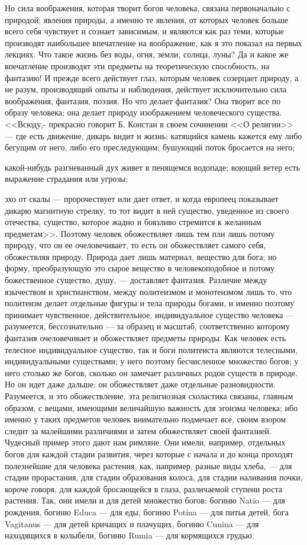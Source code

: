 \documentclass[12pt]{article}
\begin{document}
Но сила воображения, которая творит богов человека, связана первоначально с природой; явления природы, а именно те явления, от которых человек больше всего себя чувствует и сознает зависимым, и являются как раз теми, которые производят наибольшее впечатление на воображение, как я это показал на первых лекциях. Что такое жизнь без воды, огня, земли, солнца, луны? Да и какое же впечатление производят эти предметы на теоретическую способность, на фантазию! И прежде всего действует глаз, которым человек созерцает природу, а не разум, производящий опыты и наблюдения, действует исключительно сила воображения, фантазия, поэзия. Но что делает фантазия? Она творит все по образу человека; она делает природу изображением человеческого существа. <<Всюду,- прекрасно говорит Б. Констан в своем сочинении <<О религии>>  --- где есть движение, дикарь видит и жизнь; катящийся камень кажется ему либо бегущим от него, либо его преследующим; бушующий поток бросается на него; 

какой-нибудь разгневанный дух живет в пенящемся водопаде; воющий ветер есть выражение страдания или угрозы; 

эхо от скалы --- пророчествует или дает ответ, и когда европеец показывает дикарю магнитную стрелку, то тот видит в ней существо, уведенное из своего отечества, существо, которое жадно и боязливо стремится к желанным предметам>>. Поэтому человек обожествляет лишь тем пли лишь потому природу, что он ее очеловечивает, то есть он обожествляет самого себя, обожествляя природу. Природа дает лишь материал, вещество для бога; но форму, преобразующую это сырое вещество в человекоподобное и потому божественное существо, душу, --- доставляет фантазия. Различие между язычеством и христианством, между политеизмом и монотеизмом лишь то, что политеизм делает отдельные фигуры и тела природы богами, и именно поэтому принимает чувственное, действительное, индивидуальное существо человека --- разумеется, бессознательно --- за образец и масштаб, соответственно которому фантазия очеловечивает и обожествляет предметы природы. Как человек есть телесное индивидуальное существо, так и боги политеиста являются телесными, индивидуальными существами; у него поэтому бесчисленное множество богов; у него столько же богов, сколько он замечает различных родов существ в природе. Но он идет даже дальше: он обожествляет даже отдельные разновидности. Разумеется, и это обожествление, эта религиозная схоластика связаны, главным образом, с вещами, имеющими величайшую важность для эгоизма человека; ибо именно у таких предметов человек внимательно подмечает все, своим взором следит за малейшими различиями и затем обожествляет своей фантазией. Чудесный пример этого дают нам римляне. Они имели, например, отдельных богов для каждой стадии развития, через которые с начала и до конца проходят полезнейшие для человека растения, как, например, разные виды хлеба, --- для стадии прорастания, для стадии образования колоса, для стадии наливания почки, короче говоря, для каждой бросающейся в глаза, различаемой ступени роста растения. Так, они имели и для детей множество богов: богиню Natio --- для рождения, богиню Educa --- для еды, богиню Potina --- для питья детей, бога Vagitanus --- для детей кричащих и плачущих, богиню Cunina --- для находящихся в колыбели, богиню Rumia --- для кормящихся грудью. 
\end{document}
